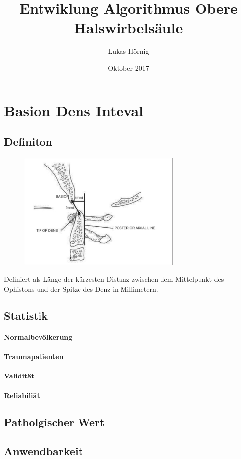 \documentclass{report}
\title{Entwiklung Algorithmus Obere Halswirbelsäule}
\author{Lukas Hörnig}
\date{Oktober 2017}
\begin{document}
\section{Basion Dens Inteval}
\subsection{Definiton}
\begin{figure}
        \includegraphics[width=8cm]{BDI.png}
\end{figure}
Definiert als Länge der kürzesten Distanz zwischen dem Mittelpunkt des Ophistons und der Spitze des Denz in Millimetern.


\subsection{Statistik}
\paragraph{Normalbevölkerung}
\paragraph{Traumapatienten}
\paragraph{Validität}
\paragraph{Reliabiliät}

\subsection{Patholgischer Wert}
\subsection{Anwendbarkeit}






\end{document}
